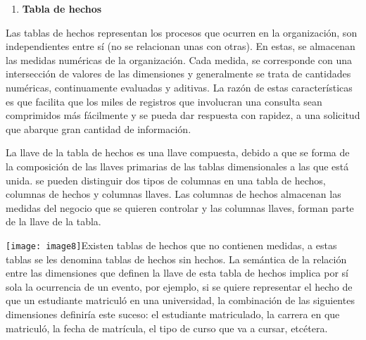 \documentclass{article} %
\begin{document}
\noindent 

\begin{enumerate}
\item  \textbf{Tabla de hechos}
\end{enumerate}

\noindent 

\noindent Las tablas de hechos representan los procesos que ocurren en la organizaci\'{o}n, son independientes entre s\'{i} (no se relacionan unas con otras). En estas, se almacenan las medidas num\'{e}ricas de la organizaci\'{o}n. Cada medida, se corresponde con una intersecci\'{o}n de valores de las dimensiones y generalmente se trata de cantidades num\'{e}ricas, continuamente evaluadas y aditivas. La raz\'{o}n de estas caracter\'{i}sticas es que facilita que los miles de registros que involucran una consulta sean comprimidos m\'{a}s f\'{a}cilmente y se pueda dar respuesta con rapidez, a una solicitud que abarque gran cantidad de informaci\'{o}n.

\noindent 

\noindent La llave de la tabla de hechos es una llave compuesta, debido a que se forma de la composici\'{o}n de las llaves primarias de las tablas dimensionales a las que est\'{a} unida. se pueden distinguir dos tipos de columnas en una tabla de hechos, columnas de hechos y columnas llaves. Las columnas de hechos almacenan las medidas del negocio que se quieren controlar y las columnas llaves, forman parte de la llave de la tabla.

\noindent 

\noindent \texttt{[image: image8]}Existen tablas de hechos que no contienen medidas, a estas tablas se les denomina tablas de hechos sin hechos. La sem\'{a}ntica de la relaci\'{o}n entre las dimensiones que definen la llave de esta tabla de hechos implica por s\'{i} sola la ocurrencia de un evento, por ejemplo, si se quiere representar el hecho de que un estudiante matricul\'{o} en una universidad, la combinaci\'{o}n de las siguientes dimensiones definir\'{i}a este suceso: el estudiante matriculado, la carrera en que matricul\'{o}, la fecha de matr\'{i}cula, el tipo de curso que va a cursar, etc\'{e}tera.

\noindent 

\noindent 

\noindent 

\noindent \textbf{}

\noindent \textbf{\underbar{}}
\end{document}
